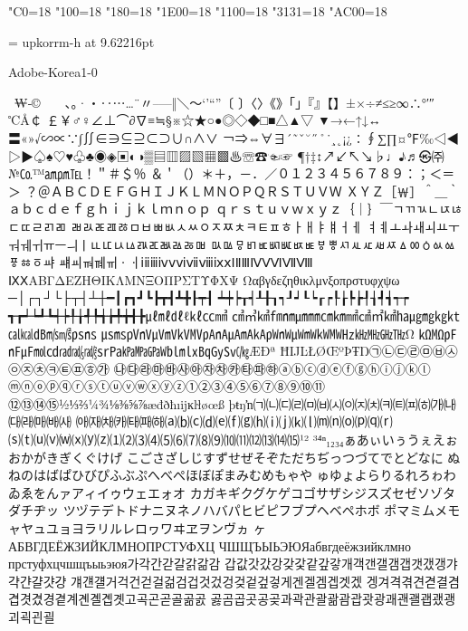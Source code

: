 %
%
%
%
\kcatcode"C0=18%
\kcatcode"100=18%
\kcatcode"180=18%
\kcatcode"1E00=18%
\kcatcode"1100=18%
\kcatcode"3131=18%
\kcatcode"AC00=18%

\font\upkorrm = upkorrm-h at 9.62216pt
\upkorrm


Adobe-Korea1-0

 ₩‐©ㅤ　、。·・‥⋯…¨〃–—‖＼～‘’“”〔
〕〈〉《》「」『』【】±×÷≠≤≥∞∴°′″℃Å￠
￡￥♂♀∠⊥⌒∂∇≡≒§※☆★○●◎◇◆□■△▲▽
▼→←↑↓↔〓«»√∽∝∵∫∬∈∋⊆⊇⊂⊃∪∩∧∨
￢⇒⇔∀∃´˜ˇ˘˝˚˙¸˛¡¿∶∮∑∏¤℉‰◁◀
▷▶♤♠♡♥♧♣◉◈▣◐◑▒▤▥▨▧▦▩♨☏☎☜☞
¶†‡↕↗↙↖↘♭♩♪♬㉿㈜№㏇™㏂㏘℡！＂＃＄％
＆＇（）＊＋，－．／０１２３４５６７８９：；＜＝＞
？＠ＡＢＣＤＥＦＧＨＩＪＫＬＭＮＯＰＱＲＳＴＵＶＷ
ＸＹＺ［￦］＾＿｀ａｂｃｄｅｆｇｈｉｊｋｌｍｎｏｐ
ｑｒｓｔｕｖｗｘｙｚ｛｜｝￣ㄱㄲㄳㄴㄵㄶㄷㄸㄹㄺㄻ
ㄼㄽㄾㄿㅀㅁㅂㅃㅄㅅㅆㅇㅈㅉㅊㅋㅌㅍㅎㅏㅐㅑㅒㅓㅔ
ㅕㅖㅗㅘㅙㅚㅛㅜㅝㅞㅟㅠㅡㅢㅣㅥㅦㅧㅨㅩㅪㅫㅬㅭㅮ
ㅯㅰㅱㅲㅳㅴㅵㅶㅷㅸㅹㅺㅻㅼㅽㅾㅿㆀㆁㆂㆃㆄㆅㆆㆇ
ㆈㆉㆊㆋㆌㆍㆎⅰⅱⅲⅳⅴⅵⅶⅷⅸⅹⅠⅡⅢⅣⅤⅥⅦⅧ
ⅨⅩΑΒΓΔΕΖΗΘΙΚΛΜΝΞΟΠΡΣΤΥΦΧΨ
Ωαβγδεζηθικλμνξοπρστυφχψω
─│┌┐┘└├┬┤┴┼━┃┏┓┛┗┣┳┫┻╋┠┯┨
┷┿┝┰┥┸╂┒┑┚┙┖┕┎┍┞┟┡┢┦┧┩┪┭┮
┱┲┵┶┹┺┽┾╀╁╃╄╅╆╇╈╉╊㎕㎖㎗ℓ㎘㏄㎣
㎤㎥㎦㎙㎚㎛㎜㎝㎞㎟㎠㎡㎢㏊㎍㎎㎏㏏㎈㎉㏈㎧㎨㎰㎱
㎲㎳㎴㎵㎶㎷㎸㎹㎀㎁㎂㎃㎄㎺㎻㎼㎽㎾㎿㎐㎑㎒㎓㎔Ω
㏀㏁㎊㎋㎌㏖㏅㎭㎮㎯㏛㎩㎪㎫㎬㏝㏐㏓㏃㏉㏜㏆ÆÐª
ĦĲĿŁØŒºÞŦŊ㉠㉡㉢㉣㉤㉥㉦㉧㉨㉩㉪㉫㉬㉭㉮
㉯㉰㉱㉲㉳㉴㉵㉶㉷㉸㉹㉺㉻ⓐⓑⓒⓓⓔⓕⓖⓗⓘⓙⓚⓛ
ⓜⓝⓞⓟⓠⓡⓢⓣⓤⓥⓦⓧⓨⓩ①②③④⑤⑥⑦⑧⑨⑩⑪
⑫⑬⑭⑮½⅓⅔¼¾⅛⅜⅝⅞æđðħıĳĸŀłøœß
þŧŋŉ㈀㈁㈂㈃㈄㈅㈆㈇㈈㈉㈊㈋㈌㈍㈎㈏㈐㈑㈒㈓㈔
㈕㈖㈗㈘㈙㈚㈛⒜⒝⒞⒟⒠⒡⒢⒣⒤⒥⒦⒧⒨⒩⒪⒫⒬⒭
⒮⒯⒰⒱⒲⒳⒴⒵⑴⑵⑶⑷⑸⑹⑺⑻⑼⑽⑾⑿⒀⒁⒂¹²
³⁴ⁿ₁₂₃₄ぁあぃいぅうぇえぉおかがきぎくぐけげ
こごさざしじすずせぜそぞただちぢっつづてでとどなに
ぬねのはばぱひびぴふぶぷへべぺほぼぽまみむめもゃや
ゅゆょよらりるれろゎわゐゑをんァアィイゥウェエォオ
カガキギクグケゲコゴサザシジスズセゼソゾタダチヂッ
ツヅテデトドナニヌネノハバパヒビピフブプヘベペホボ
ポマミムメモャヤュユョヨラリルレロヮワヰヱヲンヴヵ
ヶАБВГДЕЁЖЗИЙКЛМНОПРСТУФХЦ
ЧШЩЪЫЬЭЮЯабвгдеёжзийклмно
прстуфхцчшщъыьэюя가각간갇갈갉갊감
갑값갓갔강갖갗같갚갛개객갠갤갬갭갯갰갱갸갹갼걀걋걍
걔걘걜거걱건걷걸걺검겁것겄겅겆겉겊겋게겐겔겜겝겟겠
겡겨격겪견겯결겸겹겻겼경곁계곈곌곕곗고곡곤곧골곪곬
곯곰곱곳공곶과곽관괄괆괌괍괏광괘괜괠괩괬괭괴괵괸괼
